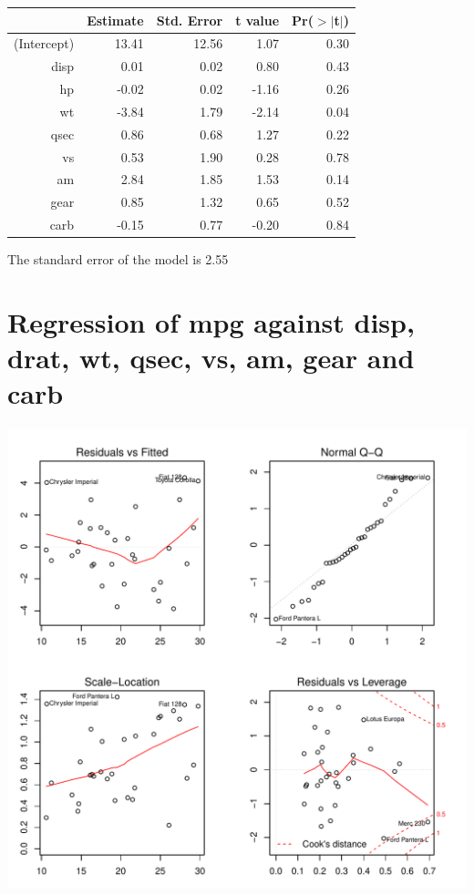 \documentclass{article}\usepackage[]{graphicx}\usepackage[]{color}
\makeatletter
\def\maxwidth{ %
  \ifdim\Gin@nat@width>\linewidth
    \linewidth
  \else
    \Gin@nat@width
  \fi
}
\newenvironment{knitrout}{}{} %
\makeatother
\begin{document}
\begin{table}[ht]
\centering
\begin{tabular}{rrrrr}
  \hline
 & Estimate & Std. Error & t value & Pr($>$$|$t$|$) \\ 
  \hline
(Intercept) & 13.41 & 12.56 & 1.07 & 0.30 \\ 
  disp & 0.01 & 0.02 & 0.80 & 0.43 \\ 
  hp & -0.02 & 0.02 & -1.16 & 0.26 \\ 
  wt & -3.84 & 1.79 & -2.14 & 0.04 \\ 
  qsec & 0.86 & 0.68 & 1.27 & 0.22 \\ 
  vs & 0.53 & 1.90 & 0.28 & 0.78 \\ 
  am & 2.84 & 1.85 & 1.53 & 0.14 \\ 
  gear & 0.85 & 1.32 & 0.65 & 0.52 \\ 
  carb & -0.15 & 0.77 & -0.20 & 0.84 \\ 
   \hline
\end{tabular}
\end{table}




The standard error of the model is 2.55

\newpage

\section{Regression of mpg against disp, drat, wt, qsec, vs, am, gear and carb }
\begin{knitrout}
\color{fgcolor}

{\centering \includegraphics[width=\maxwidth]{figure/lm-disp-drat-wt-qsec-vs-am-gear-carb} 

}



\end{knitrout}
\end{document}
